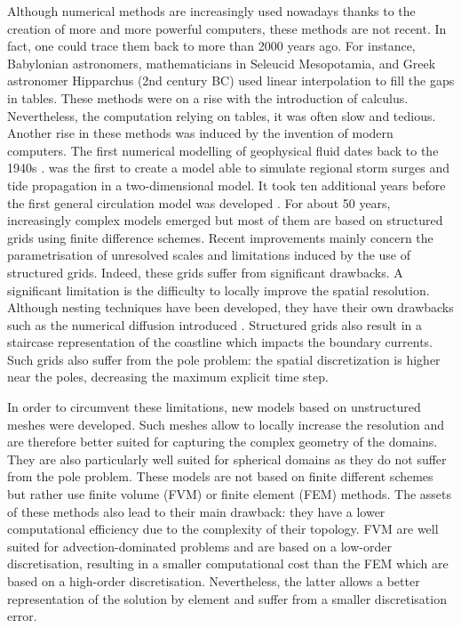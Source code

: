 Although numerical methods are increasingly used nowadays thanks to the creation of more and more powerful computers, these methods are not recent. In fact, one could trace them back to more than 2000 years ago. For instance, Babylonian astronomers, mathematicians in Seleucid Mesopotamia, and Greek astronomer Hipparchus (2nd century BC) used linear interpolation to fill the gaps in tables. These methods were on a rise with the introduction of calculus. Nevertheless, the computation relying on tables, it was often slow and tedious. Another rise in these methods was induced by the invention of modern computers. The first numerical modelling of geophysical fluid dates back to the 1940s \citep{cushman2011introduction}. \citet{hansen1956theorie} was the first to create a model able to simulate regional storm surges and tide propagation in a two-dimensional model. It took ten additional years before the first general circulation model was developed \citep{bryan1967numerical}. For about 50 years, increasingly complex models emerged but most of them are based on structured grids using finite difference schemes. Recent improvements mainly concern the parametrisation of unresolved scales and limitations induced by the use of structured grids. Indeed, these grids suffer from significant drawbacks. A significant limitation is the difficulty to locally improve the spatial resolution. Although nesting techniques have been developed, they have their own drawbacks such as the numerical diffusion introduced \citep[see, e.g.,][]{brown2016impact}. Structured grids also result in a staircase representation of the coastline which impacts the boundary currents. Such grids also suffer from the pole problem: the spatial discretization is higher near the poles, decreasing the maximum explicit time step.

In order to circumvent these limitations, new models based on unstructured meshes were developed. Such meshes allow to locally increase the resolution and are therefore better suited for capturing the complex geometry of the domains. They are also particularly well suited for spherical domains as they do not suffer from the pole problem. These models are not based on finite different schemes but rather use finite volume (FVM) or finite element (FEM) methods. The assets of these methods also lead to their main drawback: they have a lower computational efficiency due to the complexity of their topology. FVM are well suited for advection-dominated problems and are based on a low-order discretisation, resulting in a smaller computational cost than the FEM which are based on a high-order discretisation. Nevertheless, the latter allows a better representation of the solution by element and suffer from a smaller discretisation error. 

